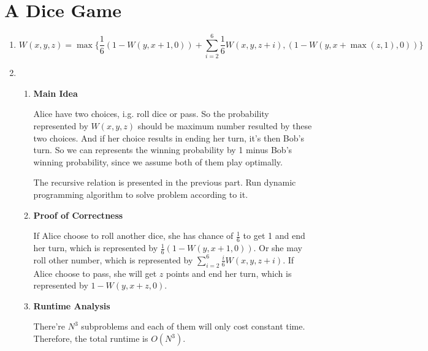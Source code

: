 \documentclass[11pt]{article}
\newenvironment{qparts}{\begin{enumerate}[{(}a{)}]}{\end{enumerate}}
\begin{document}
\section{A Dice Game}
\begin{qparts}
	
	\item 
	
	\[
		W(x, y, z) = \max \{\frac{1}{6} (1 - W(y, x+1, 0)) + \sum_{i=2}^6 \frac{1}{6} W(x, y, z + i), (1 - W(y, x+\max(z, 1), 0)) \}		
	\]
	
	\item 
	
	\renewcommand{\theenumii}{\roman{enumii}}
	\begin{enumerate}
		\item \textbf{Main Idea}
		
		Alice have two choices, i.g. roll dice or pass. So the probability represented by $W(x, y, z)$ should be maximum number resulted by these two choices. And if her choice results in ending her turn, it's then Bob's turn. So we can represents the winning probability by 1 minus Bob's winning probability, since we assume both of them play optimally.
		
		The recursive relation is presented in the previous part. Run dynamic programming algorithm to solve problem according to it.
		
		\item \textbf{Proof of Correctness}
		
		If Alice choose to roll another dice, she has chance of $\frac{1}{6}$ to get 1 and end her turn, which is represented by $\frac{1}{6} (1 - W(y, x+1, 0))$. Or she may roll other number, which is represented by $\sum_{i=2}^6 \frac{i}{6} W(x, y, z + i)$. If Alice choose to pass, she will get $z$ points and end her turn, which is represented by $1 - W(y, x+ z, 0)$.
		
		\item \textbf{Runtime Analysis}
		
		There're $N^3$ subproblems and each of them will only cost constant time. Therefore, the total runtime is $O(N^3)$.
	
	\end{enumerate}
		
\end{qparts}



\newpage
\end{document}
